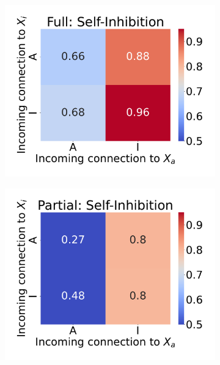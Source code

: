 \documentclass[11pt,a4paper]{article}
\begin{document}
\begin{figure}
\begin{subfigure}[c]{0.28\textwidth}
        \includegraphics[width=\textwidth]{vary_cross-II-iPSC_timeshifted-rsq-hmap}
        \caption{}
        \label{rsq-cross-i-full}
    \end{subfigure}
    \begin{subfigure}[c]{0.28\textwidth}
        \includegraphics[width=\textwidth]{vary_cross-II-Partial_timeshifted-rsq-hmap}
        \caption{}
        \label{rsq-cross-i-part}
    \end{subfigure}
    \begin{subfigure}[c]{0.32\textwidth}

\end{subfigure}
\end{figure}
\end{document}
